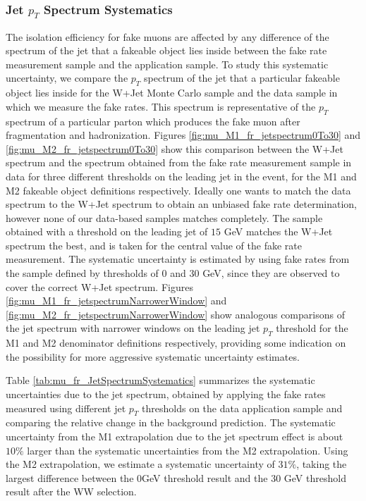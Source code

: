 \subsubsection{Jet $p_{T}$ Spectrum Systematics}
\label{sec:FakeMuonBkgJetSpectrumSystematics}

The isolation efficiency for fake muons are affected by any difference of the spectrum of the
jet that a fakeable object lies inside between the fake rate measurement sample and the 
application sample. To study this systematic uncertainty, we compare the $p_{T}$ spectrum 
of the jet that a particular fakeable object lies inside for the W+Jet Monte Carlo sample and the
data sample in which we measure the fake rates. This spectrum is representative of the $p_{T}$
spectrum of a particular parton which produces the fake muon after fragmentation and 
hadronization. Figures \ref{fig:mu_M1_fr_jetspectrum0To30} and \ref{fig:mu_M2_fr_jetspectrum0To30} show 
this comparison between the W+Jet spectrum and the spectrum obtained from the fake rate measurement 
sample in data for three different thresholds on the leading jet in the event, for the M1 and M2
fakeable object definitions respectively. Ideally one wants to match the data spectrum to the
W+Jet spectrum to obtain an unbiased fake rate determination, however none of our data-based
samples matches completely. The sample obtained with a threshold on the leading jet of
$15$ GeV matches the W+Jet spectrum the best, and is taken for the central value of the 
fake rate measurement. The systematic uncertainty is estimated by using fake rates from the sample 
defined by thresholds of $0$ and $30$ GeV, since they are observed to cover the 
correct W+Jet spectrum. Figures \ref{fig:mu_M1_fr_jetspectrumNarrowerWindow} and 
\ref{fig:mu_M2_fr_jetspectrumNarrowerWindow} show analogous 
comparisons of the jet spectrum with narrower windows on the leading jet $p_{T}$ threshold 
for the M1 and M2 denominator definitions respectively, providing some indication on the 
possibility for more aggressive systematic uncertainty estimates.

Table \ref{tab:mu_fr_JetSpectrumSystematics} summarizes the systematic
uncertainties due to the jet spectrum, obtained by applying the fake
rates measured using different jet $p_{T}$ thresholds on the data application 
sample and comparing the relative change in the background prediction. 
The systematic uncertainty from the M1 extrapolation due to the jet spectrum effect
is about $10\%$ larger than the systematic uncertainties from the M2 extrapolation. 
Using the M2 extrapolation, we estimate a systematic uncertainty of $31\%$, taking the largest 
difference between the $0$GeV threshold result and the $30$ GeV threshold result after the 
WW selection.

